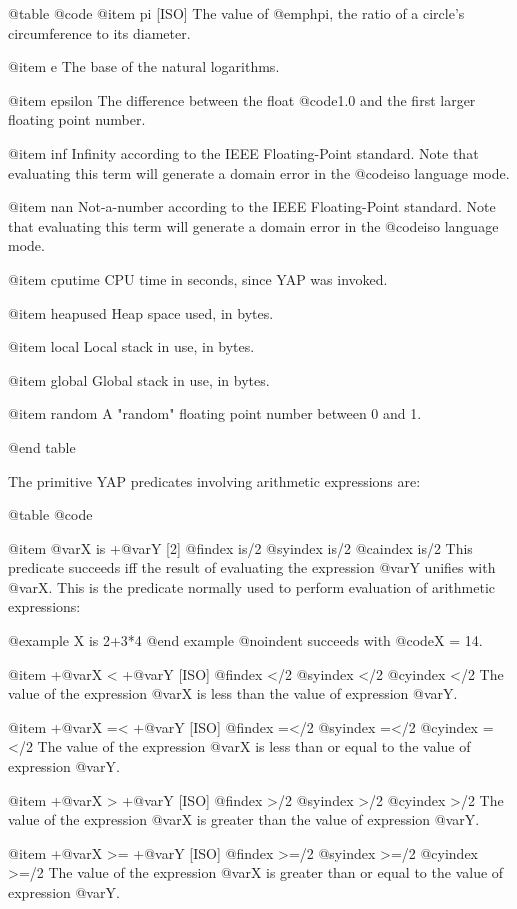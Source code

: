 {{{{@table @code
@item pi [ISO]
The value of @emph{pi}, the ratio of a circle's circumference to its
diameter.

@item e
The base of the natural logarithms.

@item epsilon
The difference between the float @code{1.0} and the first larger floating point
number.

@item inf
Infinity according to the IEEE Floating-Point standard. Note that
evaluating this term will generate a domain error in the @code{iso}
language mode.

@item nan
Not-a-number according to the IEEE Floating-Point standard. Note that
evaluating this term will generate a domain error in the @code{iso}
language mode.

@item cputime
CPU time in seconds, since YAP was invoked.

@item heapused
Heap space used, in bytes.

@item local
Local stack in use, in bytes.

@item global
Global stack in use, in bytes.

@item random
A "random" floating point number between 0 and 1.

@end table

The primitive YAP predicates involving arithmetic expressions are:

@table @code

@item @var{X} is +@var{Y} [2]
@findex is/2
@syindex is/2
@caindex is/2
This predicate succeeds iff the result of evaluating the expression
@var{Y} unifies with @var{X}. This is the predicate normally used to
perform evaluation of arithmetic expressions:

@example
X is 2+3*4
@end example
@noindent
succeeds with @code{X = 14}.

@item +@var{X} < +@var{Y} [ISO]
@findex </2
@syindex </2
@cyindex </2
The value of the expression @var{X} is less than the value of expression
@var{Y}.

@item +@var{X} =< +@var{Y} [ISO]
@findex =</2
@syindex =</2
@cyindex =</2
The value of the expression @var{X} is less than or equal to the value
of expression @var{Y}.


@item +@var{X} > +@var{Y} [ISO]
@findex >/2
@syindex >/2
@cyindex >/2
The value of the expression @var{X} is greater than the value of
expression @var{Y}.

@item +@var{X} >= +@var{Y} [ISO]
@findex >=/2
@syindex >=/2
@cyindex >=/2
The value of the expression @var{X} is greater than or equal to the
value of expression @var{Y}.

}}}}
